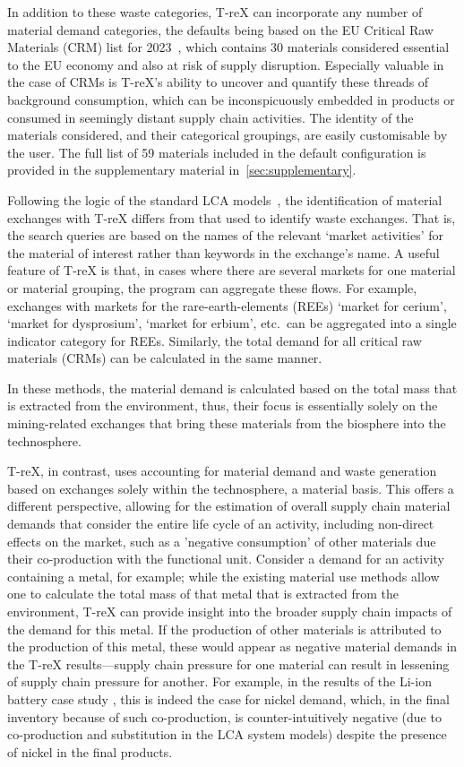 \documentclass[a4paper,fleqn]{cas-dc}
\begin{document}
In addition to these waste categories, T-reX can incorporate any number of
material demand categories, the defaults being based on the EU Critical Raw
Materials (CRM) list for 2023~\citep{eu2023crmstudy}, which contains 30
materials considered essential to the EU economy and also at risk of supply
disruption. Especially valuable in the case of CRMs is T-reX's ability to
uncover and quantify these threads of background consumption, which can be
inconspicuously embedded in products or consumed in seemingly distant supply
chain activities. The identity of the materials considered, and their
categorical groupings, are easily customisable by the user. The full list of 59
materials included in the default configuration is provided in the
supplementary material in~\autoref{sec:supplementary}.

Following the logic of the standard LCA models~\cite{ecoinvent2016version3, guinee2004economicallocation},
 the identification of material exchanges with
T-reX differs from that used to identify waste exchanges. That is, the search
queries are based on the names of the relevant `market activities' for the
material of interest rather than keywords in the exchange's name. A useful
feature of T-reX is that, in cases where there are several markets for one
material or material grouping, the program can aggregate these flows. For
example, exchanges with markets for the rare-earth-elements (REEs) `market for
cerium', `market for dysprosium', `market for erbium', etc.\ can be aggregated
into a single indicator category for REEs. Similarly, the total demand for all
critical raw materials (CRMs) can be calculated in the same manner.

In these methods, the material demand is calculated based on the total mass
that is extracted from the environment, thus, their focus is essentially solely
on the mining-related exchanges that bring these materials from the biosphere
into the technosphere.

T-reX, in contrast, uses accounting for material demand and waste generation
based on exchanges solely within the technosphere, a material basis. This
offers a different perspective, allowing for the estimation of overall supply
chain material demands that consider the entire life cycle of an activity,
including non-direct effects on the market, such as a 'negative consumption' of
other materials due their co-production with the functional unit. Consider a
demand for an activity containing a metal, for example; while the existing
material use methods allow one to calculate the total mass of that metal that
is extracted from the environment, T-reX can provide insight into the broader
supply chain impacts of the demand for this metal. If the production of other
materials is attributed to the production of this metal, these would appear as
negative material demands in the T-reX results---supply chain pressure for one
material can result in lessening of supply chain pressure for another. For
example, in the results of the Li-ion battery case study , this is indeed the
case for nickel demand, which, in the final inventory because of such
co-production, is counter-intuitively negative (due to co-production and
substitution in the LCA system models) despite the presence of nickel in the
final products.
\end{document}
